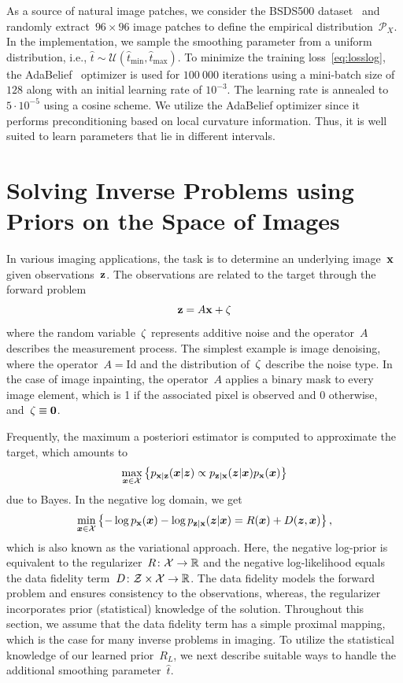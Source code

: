 \documentclass{article} %
\theoremstyle{plain}
\theoremstyle{definition}
\theoremstyle{remark}
\newcommand{\X}{\mathcal{X}}
\newcommand{\Z}{\mathcal{Z}}
\newcommand{\id}{\mathrm{Id}}
\renewcommand{\vec}[1]{\mathbf{#1}}
\def\hatt{{\widehat{t}}}
\newcommand{\tminh}{\hatt_\mathrm{min}}
\newcommand{\tmaxh}{\hatt_\mathrm{max}}
\newcommand{\dist}[1]{\mathcal{P}_{#1}}
\newcommand{\pdf}[1]{p_{#1}}
\begin{document}
As a source of natural image patches, we consider the BSDS500 dataset~\cite{MaFo01} and randomly extract~$96\times 96$ image patches to define the empirical distribution~$\dist{X}$.
In the implementation, we sample the smoothing parameter from a uniform distribution, i.e., $\widehat{t}\sim\mathcal{U}(\tminh,\tmaxh)$.
To minimize the training loss~\eqref{eq:losslog}, the AdaBelief~\citep{ZhTa20} optimizer is used for $100\ 000$ iterations using a mini-batch size of~$128$ along with an initial learning rate of $10^{-3}$.
The learning rate is annealed to~$5\cdot 10^{-5}$ using a cosine scheme.
We utilize the AdaBelief optimizer since it performs preconditioning based on local curvature information.
Thus, it is well suited to learn parameters that lie in different intervals.


\section{Solving Inverse Problems using Priors on the Space of Images}
In various imaging applications, the task is to determine an underlying image~${\mathbf{x}}$ given observations~${\mathbf{z}}$.
The observations are related to the target through the forward problem
\[
{\mathbf{z}} = A {\mathbf{x}} + {\mathbf{\zeta}}
\]
where the random variable~${\mathbf{\zeta}}$ represents additive noise and the operator~$A$ describes the measurement process.
The simplest example is image denoising, where the operator~$A=\id$ and the distribution of~${\mathbf{\zeta}}$ describe the noise type.
In the case of image inpainting, the operator~$A$ applies a binary mask to every image element, which is 1 if the associated pixel is observed and 0 otherwise, and~$\rvzeta\equiv\vec{0}$.

Frequently, the maximum a posteriori estimator is computed to approximate the target, which amounts to
\[
\max_{\vx\in\X}\left\{\pdf{\rvx\vert\rvz}(\vx\vert\vz)\propto \pdf{\rvz\vert\rvx}(\vz\vert\vx)\pdf{\rvx}(\vx)\right\}
\]
due to Bayes.
In the negative log domain, we get
\[
\min_{\vx\in\X}\left\{ -\log\pdf{\rvx}(\vx) -\log\pdf{\rvz\vert\rvx}(\vz\vert\vx) = R(\vx) + D(\vz,\vx)\right\},
\]
which is also known as the variational approach.
Here, the negative log-prior is equivalent to the regularizer~$R\colon\X\to\R$ and the negative log-likelihood equals the data fidelity term~$D\colon\Z\times\X\to\R$.
The data fidelity models the forward problem and ensures consistency to the observations, whereas, the regularizer incorporates prior (statistical) knowledge of the solution.
Throughout this section, we assume that the data fidelity term has a simple proximal mapping, which is the case for many inverse problems in imaging.
To utilize the statistical knowledge of our learned prior~$R_L$, we next describe suitable ways to handle the additional smoothing parameter~$\widehat{t}$.
\end{document}
